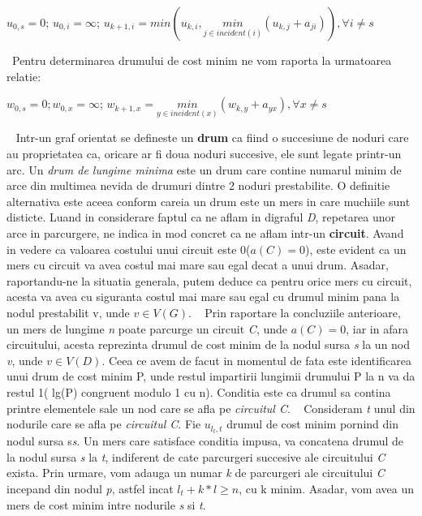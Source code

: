 \documentclass{article}
\begin{document}
\begin{center}{$u_{0,s} = 0$; $u_{0,i} = \infty$; $u_{k+1,i} = min(u_{k,i}, \underset{j \in incident(i)}{min}(u_{k,j} + a_{ji})), \forall i  \neq s$ }
\end{center}
\	
Pentru determinarea drumului de	cost minim ne vom raporta la urmatoarea relatie:
\begin{center} {$w_{0,s}=0;
			w_{0,x}=\infty$; 
			$w_{k+1,x}=\underset{y \in incident(x)}{min}(w_{k,y}+a_{yx}), \forall x \neq s$}
\end{center}
\
\newline
Intr-un graf orientat se defineste un \textbf{drum} ca fiind o succesiune de noduri care au proprietatea ca, oricare ar fi doua noduri succesive, ele sunt legate printr-un arc. Un \textit{drum de lungime minima} este un drum care contine numarul minim de arce din multimea nevida de drumuri dintre 2 noduri prestabilite. O definitie alternativa este aceea conform careia un drum este un mers in care muchiile sunt disticte.
Luand in considerare faptul ca ne aflam in digraful \textit{D}, repetarea unor arce in parcurgere, ne indica in mod concret ca ne aflam intr-un \textbf{circuit}. Avand in vedere ca valoarea costului unui circuit este 0($a(C)=0$), este evident ca un mers cu circuit va avea costul mai mare sau egal decat a unui drum. Asadar, raportandu-ne la situatia generala, putem deduce ca pentru orice mers cu circuit, acesta va avea cu siguranta costul mai mare sau egal cu drumul minim pana la nodul prestabilit v, unde $v \in V(G)$.
\
\newline
\newline
Prin raportare la concluziile anterioare, un mers de lungime \textit{n} poate parcurge un circuit \textit{C}, unde $a(C)=0$, iar in afara circuitului, acesta reprezinta drumul de cost minim de la nodul sursa \textit{s} la un nod \textit{v}, unde $v \in V(D)$. Ceea ce avem de facut in momentul de fata este identificarea unui drum de cost minim P, unde restul impartirii lungimii drumului P la n va da restul 1( lg(P) congruent modulo 1 cu n). Conditia este ca drumul sa contina printre elementele sale un nod care se afla pe \textit{circuitul C}.
\
\newline
\newline
Consideram \textit{t} unul din nodurile care se afla pe \textit{circuitul C}. Fie $u_{l_t, t}$ drumul de cost minim pornind din nodul sursa s\textit{s}. Un mers care satisface conditia impusa, va concatena drumul de la nodul sursa \textit{s} la \textit{t}, indiferent de cate parcurgeri succesive ale circuitului \textit{C} exista. Prin urmare, vom adauga un numar \textit{k} de parcurgeri ale circuitului \textit{C} incepand din nodul \textit{p}, astfel incat $l_t + k*l \geq n$, cu k minim. Asadar, vom avea un mers de cost minim intre nodurile \textit{s} si \textit{t}. 
\end{document}
